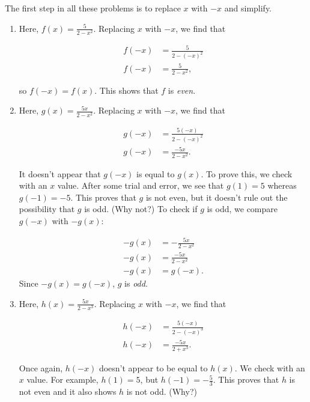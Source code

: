 \documentclass[nooutcomes]{ximera}
\begin{document}
\begin{explanation}
The first step in all these problems is to replace $x$ with $-x$ and simplify.

\begin{enumerate}
\item Here, $f(x) = \frac{5}{2 - x^2}$. Replacing $x$ with $-x$, we find that

\begin{align*}
f(-x) & = \frac{5}{2 - (-x)^2}\\
f(-x) & = \frac{5}{2 - x^2},
\end{align*}

so $f(-x) = f(x)$. This shows that $f$ is \emph{even}. 

\item Here, $g(x) = \frac{5x}{2 - x^2}$. Replacing $x$ with $-x$, we find that

\begin{align*}
g(-x) & = \frac{5(-x)}{2 - (-x)^2}\\
g(-x) & = \frac{-5x}{2 - x^2}.
\end{align*}

It doesn't appear that $g(-x)$ is equal to $g(x)$. To prove this, we check with an $x$ value. After some trial and error, we see that $g(1) = 5$ whereas $g(-1) = -5$. This proves that $g$ is not even, but it doesn't rule out the possibility that $g$ is odd. (Why not?) To check if $g$ is odd, we compare $g(-x)$ with $-g(x)$:

\begin{align*}
-g(x) & = -\frac{5x}{2 - x^2} \\
-g(x) & = \frac{-5x}{2 - x^2} \\
-g(x) & = g(-x).
\end{align*}
Since $-g(x) = g(-x)$, $g$ is \emph{odd}.

\item Here, $h(x) = \frac{5x}{2 - x^3}$. Replacing $x$ with $-x$, we find that 

\begin{align*}
h(-x) & = \frac{5(-x)}{2 - (-x)^3} \\
h(-x) & = \frac{-5x}{2 + x^3}.
\end{align*}

Once again, $h(-x)$ doesn't appear to be equal to $h(x)$. We check with an $x$ value. For example, $h(1) = 5$, but $h(-1) = -\frac{5}{3}$. This proves that $h$ is not even and it also shows $h$ is not odd. (Why?)

\end{enumerate}
\end{explanation}
\end{document}
